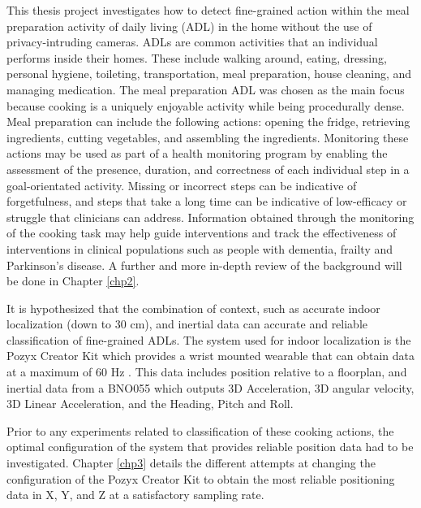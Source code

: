 This thesis project investigates how to detect fine-grained action within the meal preparation activity of daily living 
(ADL) in the home without the use of privacy-intruding cameras. ADLs are common activities that an individual 
performs inside their homes. These include walking around, eating, dressing, personal hygiene, toileting, 
transportation, meal preparation, house cleaning, and managing medication. The meal preparation ADL was chosen as the 
main focus because cooking is a uniquely enjoyable activity while being procedurally dense. 
Meal preparation can include 
the following actions: opening the fridge, retrieving ingredients, cutting vegetables, and assembling the ingredients. 
Monitoring these actions may be used as part of a health monitoring program by enabling the assessment of the presence, 
duration, and correctness of each individual step in a goal-orientated activity. Missing or incorrect steps can be indicative of 
forgetfulness, and steps that take a long time can be indicative of low-efficacy or struggle that clinicians can address.
Information obtained through the monitoring of the cooking task may help guide interventions 
and track the effectiveness of interventions in clinical populations such as people with dementia, frailty and Parkinson's disease. 
A further and more in-depth review of the background will be done in Chapter \ref{chp2}.

It is hypothesized that the combination of context, such as accurate 
indoor localization (down to 30 cm), and inertial data can accurate and reliable 
classification of fine-grained ADLs. 
The system used for indoor localization is the Pozyx Creator Kit which provides a wrist mounted 
wearable that can obtain data at a maximum of 60 Hz \cite{pozyx_creator_nodate}. This data includes position relative to a 
floorplan, and inertial data from a BNO055 which outputs 3D Acceleration, 3D angular velocity, 
3D Linear Acceleration, and the Heading, Pitch and Roll.

Prior to any experiments related to classification of these cooking actions, the optimal 
configuration of the system that provides reliable position data had to be investigated. 
Chapter \ref{chp3} details the different attempts at changing the configuration of the Pozyx 
Creator Kit to obtain the most reliable positioning data in X, Y, and Z at a satisfactory 
sampling rate. 
